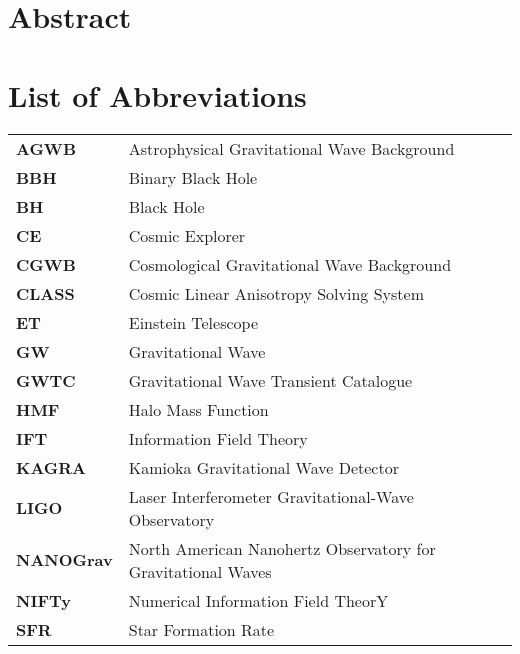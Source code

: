 \documentclass[twoside, 12pt, openany]{book}
\begin{document}
\setcounter{tocdepth}{3}

\chapter*{Abstract}


\chapter*{List of Abbreviations}

\begin{table}[h]
        \begin{tabular}{l l}
            \textbf{AGWB} & Astrophysical Gravitational Wave Background
            \\
            \textbf{BBH} & Binary Black Hole
            \\
            \textbf{BH} & Black Hole
            \\
            \textbf{CE} & Cosmic Explorer
            \\
            \textbf{CGWB} & Cosmological Gravitational Wave Background
            \\
            \textbf{CLASS} & Cosmic Linear Anisotropy Solving System 
            \\
            \textbf{ET} & Einstein Telescope
            \\
            \textbf{GW} & Gravitational Wave
            \\
            \textbf{GWTC} & Gravitational Wave Transient Catalogue
            \\
            \textbf{HMF} & Halo Mass Function
            \\
            \textbf{IFT} & Information Field Theory
            \\
            \textbf{KAGRA} & Kamioka Gravitational Wave Detector
            \\
            \textbf{LIGO} & Laser Interferometer Gravitational-Wave Observatory
            \\
            \textbf{NANOGrav} & North American Nanohertz Observatory for Gravitational Waves
            \\
            \textbf{NIFTy} & Numerical Information Field TheorY
            \\
            \textbf{SFR} & Star Formation Rate

        \end{tabular}
\end{table}
\end{document}
